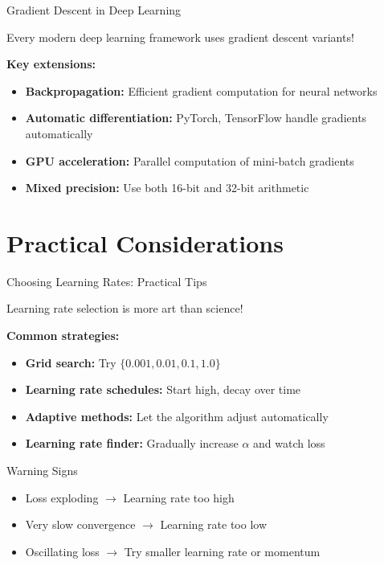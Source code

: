 \documentclass[usenames,dvipsnames]{beamer}
\begin{document}
  \begin{frame}{Gradient Descent in Deep Learning}
    \begin{keypointsbox}
    Every modern deep learning framework uses gradient descent variants!
    \end{keypointsbox}
    
    \pause
    \textbf{Key extensions:}
    \begin{itemize}[<+->]
        \item \textbf{Backpropagation:} Efficient gradient computation for neural networks
        \item \textbf{Automatic differentiation:} PyTorch, TensorFlow handle gradients automatically
        \item \textbf{GPU acceleration:} Parallel computation of mini-batch gradients
        \item \textbf{Mixed precision:} Use both 16-bit and 32-bit arithmetic
    \end{itemize}
    
    \pause
  \end{frame}

  \section{Practical Considerations}

  \begin{frame}{Choosing Learning Rates: Practical Tips}
    \begin{keypointsbox}
    Learning rate selection is more art than science!
    \end{keypointsbox}
    
    \pause
    \textbf{Common strategies:}
    \begin{itemize}[<+->]
        \item \textbf{Grid search:} Try $\{0.001, 0.01, 0.1, 1.0\}$
        \item \textbf{Learning rate schedules:} Start high, decay over time
        \item \textbf{Adaptive methods:} Let the algorithm adjust automatically
        \item \textbf{Learning rate finder:} Gradually increase $\alpha$ and watch loss
    \end{itemize}
    
    \pause
    \begin{alertbox}{Warning Signs}
    \begin{itemize}
        \item Loss exploding $\rightarrow$ Learning rate too high
        \item Very slow convergence $\rightarrow$ Learning rate too low  
        \item Oscillating loss $\rightarrow$ Try smaller learning rate or momentum
    \end{itemize}
    \end{alertbox}
  \end{frame}
\end{document}
